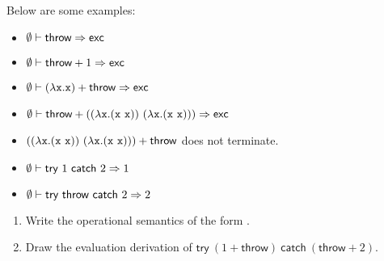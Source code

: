 \begin{exercise}
Below are some examples:

\begin{itemize}
  \item $\emptyset\vdash\textsf{throw}\Rightarrow\textsf{exc}$
  \item $\emptyset\vdash\textsf{throw}+1\Rightarrow\textsf{exc}$
  \item $\emptyset\vdash(\lambda\texttt{x}.\texttt{x})+\textsf{throw}\Rightarrow\textsf{exc}$
  \item $\emptyset\vdash\textsf{throw}+((\lambda\texttt{x}.(\texttt{x}\ \texttt{x}))\ (\lambda\texttt{x}.(\texttt{x}\ \texttt{x})))\Rightarrow\textsf{exc}$
  \item $((\lambda\texttt{x}.(\texttt{x}\ \texttt{x}))\ (\lambda\texttt{x}.(\texttt{x}\ \texttt{x})))+\textsf{throw}$ does not terminate.
  \item $\evale{\textsf{try}\ 1\ \textsf{catch}\ 2}{1}$
  \item $\evale{\textsf{try}\ \textsf{throw}\ \textsf{catch}\ 2}{2}$
\end{itemize}

\begin{enumerate}
    \item Write the operational semantics of the form
    .
    \item Draw the evaluation derivation of $\textsf{try}\ (1 + \textsf{throw})\ \textsf{catch}\ (\textsf{throw} + 2)$.
\end{enumerate}

\end{exercise}
